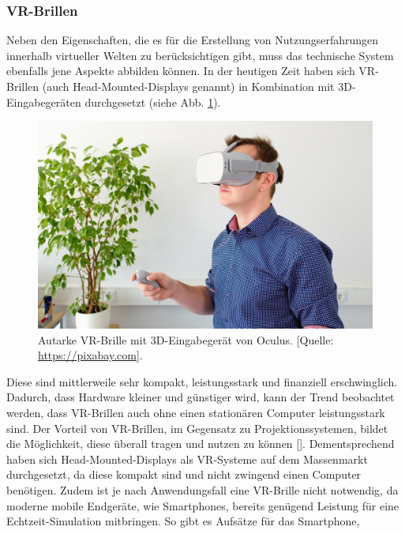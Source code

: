 \documentclass[a4paper,12pt,oneside]{article}
\begin{document}
      \subsubsection{VR-Brillen}
        Neben den Eigenschaften, die es für die Erstellung von
        Nutzungserfahrungen innerhalb virtueller Welten zu berücksichtigen gibt, 
        muss das technische System ebenfalls jene Aspekte
        abbilden können. In der heutigen Zeit haben sich VR-Brillen 
        (auch Head-Mounted-Displays genannt) in 
        Kombination mit 3D-Eingabegeräten durchgesetzt
        (siehe Abb. \ref{fig:vr-brille}).
        \begin{figure}[t]
          \centering
          \includegraphics[scale=0.3]{img/vr-brille.jpg}
          \caption[Autarke VR-Brille mit 3D-Eingabegerät von Oculus.]{Autarke VR-Brille mit 3D-Eingabegerät von Oculus. [Quelle: \url{https://pixabay.com}].}
          \label{fig:vr-brille}
        \end{figure}
        Diese sind mittlerweile sehr kompakt,
        leistungsstark und finanziell erschwinglich. Dadurch, dass Hardware kleiner
        und günstiger wird, kann der Trend beobachtet werden, dass VR-Brillen auch ohne
        einen stationären Computer leistungsstark sind.
        Der Vorteil von VR-Brillen, im Gegensatz zu Projektionssystemen, bildet die 
        Möglichkeit, diese überall tragen und nutzen zu können [\cite[129]{Dorner2013}].
        Dementsprechend haben sich Head-Mounted-Displays als VR-Systeme auf dem Massenmarkt
        durchgesetzt, da diese kompakt sind und nicht zwingend einen Computer benötigen.
        Zudem ist je nach Anwendungsfall eine VR-Brille nicht notwendig, da moderne 
        mobile Endgeräte, wie Smartphones, bereits genügend Leistung für eine 
        Echtzeit-Simulation mitbringen. So gibt es Aufsätze für das Smartphone,
\end{document}
